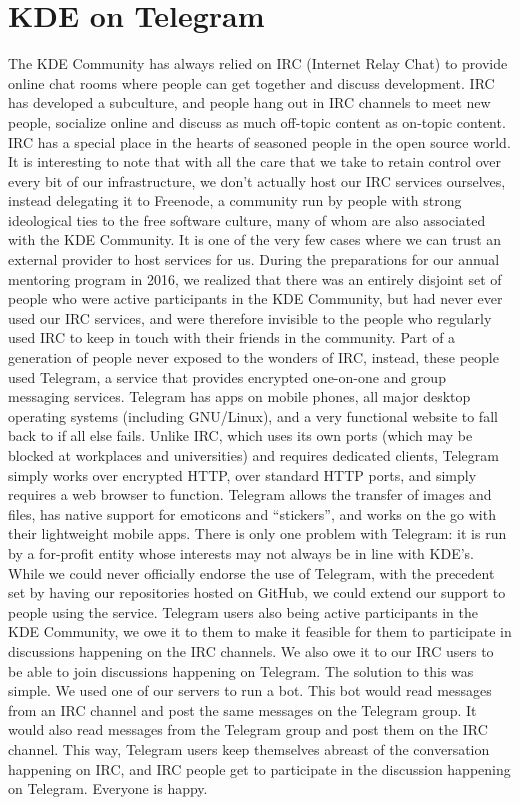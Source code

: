 \section*{KDE on Telegram}
The KDE Community has always relied on IRC (Internet Relay Chat) to provide online chat rooms where people can get together and discuss development. IRC has developed a subculture, and people hang out in IRC channels to meet new people, socialize online and discuss as much off-topic content as on-topic content. IRC has a special place in the hearts of seasoned people in the open source world.
It is interesting to note that with all the care that we take to retain control over every bit of our infrastructure, we don't actually host our IRC services ourselves, instead delegating it to Freenode, a community run by people with strong ideological ties to the free software culture, many of whom are also associated with the KDE Community. It is one of the very few cases where we can trust an external provider to host services for us.
During the preparations for our annual mentoring program in 2016, we realized that there was an entirely disjoint set of people who were active participants in the KDE Community, but had never ever used our IRC services, and were therefore invisible to the people who regularly used IRC to keep in touch with their friends in the community.
Part of a generation of people never exposed to the wonders of IRC, instead, these people used Telegram, a service that provides encrypted one-on-one and group messaging services. Telegram has apps on mobile phones, all major desktop operating systems (including GNU/Linux), and a very functional website to fall back to if all else fails. Unlike IRC, which uses its own ports (which may be blocked at workplaces and universities) and requires dedicated clients, Telegram simply works over encrypted HTTP, over standard HTTP ports, and simply requires a web browser to function. Telegram allows the transfer of images and files, has native support for emoticons and “stickers”, and works on the go with their lightweight mobile apps. There is only one problem with Telegram: it is run by a for-profit entity whose interests may not always be in line with KDE's.
While we could never officially endorse the use of Telegram, with the precedent set by having our repositories hosted on GitHub, we could extend our support to people using the service. Telegram users also being active participants in the KDE Community, we owe it to them to make it feasible for them to participate in discussions happening on the IRC channels. We also owe it to our IRC users to be able to join discussions happening on Telegram.
The solution to this was simple. We used one of our servers to run a bot. This bot would read messages from an IRC channel and post the same messages on the Telegram group. It would also read messages from the Telegram group and post them on the IRC channel. This way, Telegram users keep themselves abreast of the conversation happening on IRC, and IRC people get to participate in the discussion happening on Telegram. Everyone is happy.

